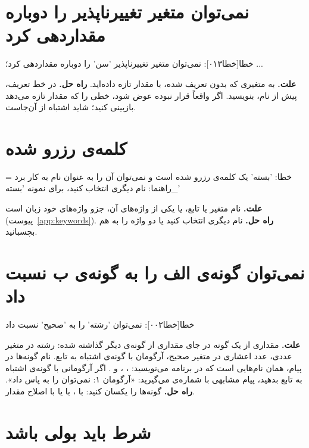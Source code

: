 \section*{نمی‌توان متغیر تغییرناپذیر را دوباره مقداردهی کرد}

\begin{progoutfa}
خطا[خطا۰۱۳]: نمی‌توان متغیر تغییرناپذیر 'سن' را دوباره مقداردهی کرد؛ ...
\end{progoutfa}

\textbf{علت.} به متغیری که بدون  تعریف شده، با \code{=} مقدار
تازه داده‌اید.
\textbf{راه حل.} در خط تعریف، پیش از نام،  بنویسید. اگر واقعاً
قرار نبوده عوض شود، خطی را که مقدار تازه می‌دهد بازبینی کنید؛ شاید
اشتباه از آن‌جاست.

\section*{کلمه‌ی رزرو شده}

\begin{progoutfa}
خطا: 'بسته' یک کلمه‌ی رزرو شده است و نمی‌توان آن را به عنوان نام به کار برد
  = راهنما: نام دیگری انتخاب کنید، برای نمونه 'بسته_'
\end{progoutfa}

\textbf{علت.} نام متغیر یا تابع، یا یکی از واژه‌های آن، جزو واژه‌های خود
زبان است (پیوست~\ref{app:keywords}).
\textbf{راه حل.} نام دیگری انتخاب کنید یا دو واژه را به هم بچسبانید.

\section*{نمی‌توان گونه‌ی الف را به گونه‌ی ب نسبت داد}

\begin{progoutfa}
خطا[خطا۰۰۲]: نمی‌توان 'رشته' را به 'صحیح' نسبت داد
\end{progoutfa}

\textbf{علت.} مقداری از یک گونه در جای مقداری از گونه‌ی دیگر گذاشته شده: رشته
در متغیر عددی، عدد اعشاری در متغیر صحیح، آرگومان با گونه‌ی اشتباه به تابع.
نام گونه‌ها در پیام، همان نام‌هایی است که در برنامه می‌نویسید:
، ،  و . اگر آرگومانی با
گونه‌ی اشتباه به تابع بدهید، پیام مشابهی با شماره‌ی  می‌گیرید:
«آرگومان ۱: نمی‌توان  را به  پاس داد».
\textbf{راه حل.} گونه‌ها را یکسان کنید: با ، با
 یا با اصلاح مقدار.

\section*{شرط باید بولی باشد}

